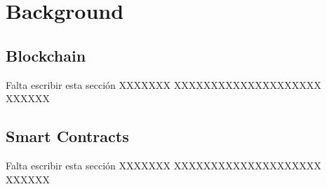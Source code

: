 \section{Background}
\label{sec:background}




\subsection{Blockchain}
Falta escribir esta sección XXXXXXX
XXXXXXXXXXXXXXXXXXXX
XXXXXX

\subsection{Smart Contracts}
Falta escribir esta sección XXXXXXX
XXXXXXXXXXXXXXXXXXXX
XXXXXX




